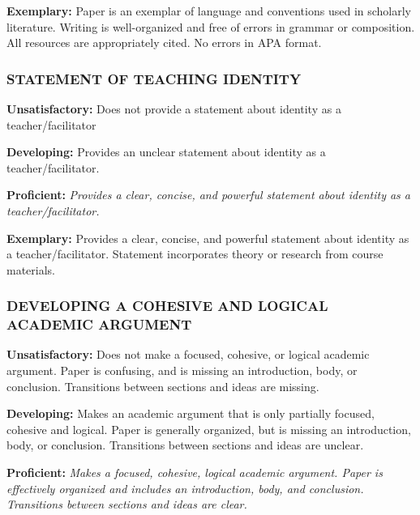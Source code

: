 \documentclass[
]{book}
\begin{document}
\textbf{Exemplary:} Paper is an exemplar of language and conventions used in scholarly literature. Writing is well-organized and free of errors in grammar or composition. All resources are appropriately cited. No errors in APA format.

\hypertarget{statement-of-teaching-identity}{%
\subsubsection*{STATEMENT OF TEACHING IDENTITY}\label{statement-of-teaching-identity}}

\textbf{Unsatisfactory:} Does not provide a statement about identity as a teacher/facilitator

\textbf{Developing:} Provides an unclear statement about identity as a teacher/facilitator.

\textbf{Proficient:} \emph{Provides a clear, concise, and powerful statement about identity as a teacher/facilitator.}

\textbf{Exemplary:} Provides a clear, concise, and powerful statement about identity as a teacher/facilitator. Statement incorporates theory or research from course materials.

\hypertarget{developing-a-cohesive-and-logical-academic-argument}{%
\subsubsection*{DEVELOPING A COHESIVE AND LOGICAL ACADEMIC ARGUMENT}\label{developing-a-cohesive-and-logical-academic-argument}}

\textbf{Unsatisfactory:} Does not make a focused, cohesive, or logical academic argument. Paper is confusing, and is missing an introduction, body, or conclusion. Transitions between sections and ideas are missing.

\textbf{Developing:} Makes an academic argument that is only partially focused, cohesive and logical. Paper is generally organized, but is missing an introduction, body, or conclusion. Transitions between sections and ideas are unclear.

\textbf{Proficient:} \emph{Makes a focused, cohesive, logical academic argument. Paper is effectively organized and includes an introduction, body, and conclusion. Transitions between sections and ideas are clear.}
\end{document}
